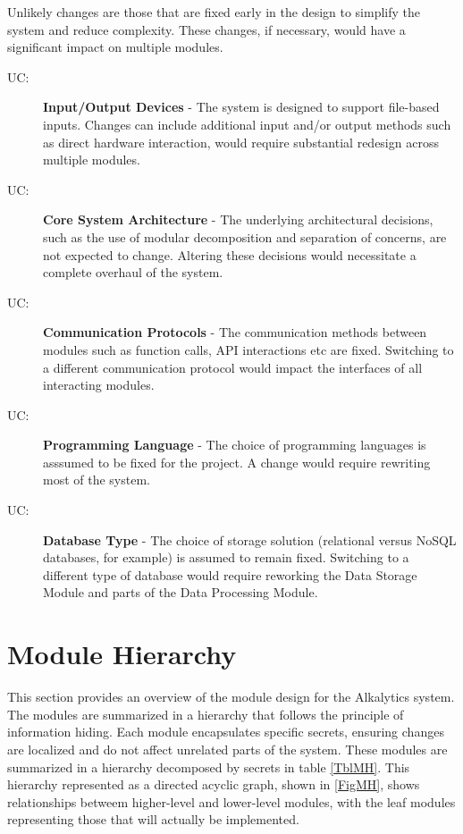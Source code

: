 \documentclass[12pt, titlepage]{article}
\newcounter{ucnum}
\newcommand{\uctheucnum}{UC\theucnum}
\begin{document}
Unlikely changes are those that are fixed early in the design to simplify the system
and reduce complexity. These changes, if necessary, would have a significant impact on
multiple modules.

\begin{description}
  \item[ \uctheucnum \label{ucIO}:] \textbf{Input/Output Devices} - 
  The system is designed to support file-based inputs. Changes can include additional input
  and/or output methods such as direct hardware interaction, would require substantial
  redesign across multiple modules.
  
  \item[ \uctheucnum \label{ucSysArch}:] \textbf{Core System Architecture} -
  The underlying architectural decisions, such as the use of modular decomposition and separation
  of concerns, are not expected to change. Altering these decisions would necessitate a complete overhaul
  of the system.
  
  \item[ \uctheucnum \label{ucComms}:] \textbf{Communication Protocols} -
  The communication methods between modules such as function calls, API interactions etc are fixed. 
  Switching to a different communication protocol would impact the interfaces of all interacting modules.

  \item[ \uctheucnum \label{ucLanguage}:] \textbf{Programming Language} -
  The choice of programming languages is asssumed to be fixed for the project. A change would
  require rewriting most of the system.

  \item[ \uctheucnum \label{ucDatabase}:] \textbf{Database Type} -
  The choice of storage solution (relational versus NoSQL databases, for example) is assumed to remain
  fixed. Switching to a different type of database would require reworking the Data Storage
  Module and parts of the Data Processing Module.

\end{description}

\section{Module Hierarchy} \label{SecMH}

This section provides an overview of the module design for the Alkalytics system.
The modules are summarized in a hierarchy that follows the principle of information
hiding. Each module encapsulates specific secrets, ensuring changes are localized
and do not affect unrelated parts of the system. These modules are summarized in
a hierarchy decomposed by secrets in table \ref{TblMH}. This hierarchy represented
as a directed acyclic graph, shown in \ref{FigMH}, shows relationships betweem
higher-level and lower-level modules, with the leaf modules representing those that
will actually be implemented.
\end{document}
